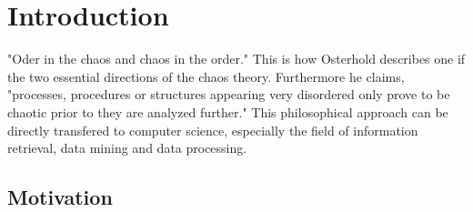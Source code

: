 
\chapter{Introduction\label{cha:chapter1}}


"Oder in the chaos and chaos in the order." This is how Osterhold describes one if the two essential directions of the chaos theory. Furthermore he claims, "processes, procedures or structures appearing very disordered only prove to be chaotic prior to they are analyzed further." This philosophical approach can be directly transfered to computer science, especially the field of information retrieval, data mining and data processing. 

\section{Motivation\label{sec:moti}}


